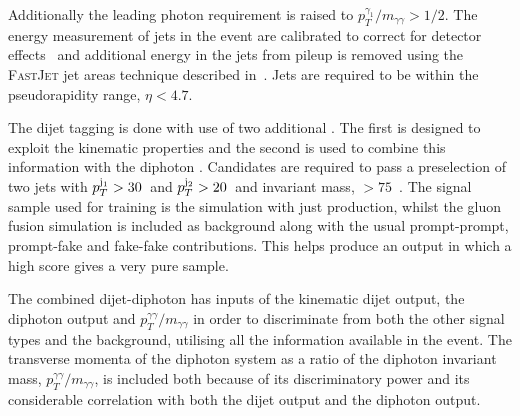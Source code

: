 Additionally the leading photon \pT requirement is raised to $p_{T}^{\gamma_{1}}/m_{\gamma\gamma}>1/2$. The energy measurement of jets in the event are calibrated to correct for detector effects~\cite{jet_energy_corrections} and additional energy in the jets from pileup is removed using the \textsc{FastJet} jet areas technique described in~\cite{pu_jets1,pu_jets2,pu_jets3}. Jets are required to be within the pseudorapidity range, $\eta<4.7$.

The dijet tagging is done with use of two additional \MVAs. The first is designed to exploit the \VBF kinematic properties and the second is used to combine this information with the diphoton \BDT. Candidates are required to pass a \VBF preselection of two jets with $p_{T}^{\mathrm{j}_{1}}>30$~\GeV and $p_{T}^{\mathrm{j}_{2}}>20$~\GeV and invariant mass, \mjj$>75$~\GeV. The signal sample used for training is the \SM \MC simulation with just \VBF production, whilst the \SM gluon fusion \MC simulation is included as background along with the usual prompt-prompt, prompt-fake and fake-fake contributions. This helps produce an output in which a high score gives a very pure \VBF sample.

The combined dijet-diphoton \BDT has inputs of the kinematic dijet \BDT output, the diphoton \BDT output and $p_{T}^{\gamma\gamma}/m_{\gamma\gamma}$ in order to discriminate \VBF from both the other signal types and the background, utilising all the information available in the event. The transverse momenta of the diphoton system as a ratio of the diphoton invariant mass, $p_{T}^{\gamma\gamma}/m_{\gamma\gamma}$, is included both because of its discriminatory power and its considerable correlation with both the dijet \BDT output and the diphoton \BDT output.

